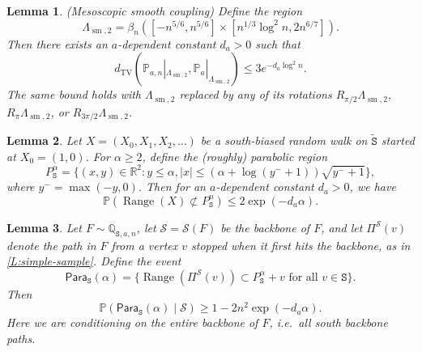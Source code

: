 \documentclass[10pt,a4paper]{amsart}
\newtheorem{lem}{Lemma}
\renewcommand{\P}{\mathbb{P}}
\newcommand{\Q}{\mathbb{Q}}
\newcommand{\R}{\mathbb{R}}
\newcommand{\cS}{\mathcal{S}}
\renewcommand{\tt}[1]{{\mathtt{#1}}}
\begin{document}
	\begin{lem} (Mesoscopic smooth coupling)
		\label{L:global-coupling-2}
		Define the region
		$$
		\Lambda_{\operatorname{sm}, 2} = \beta_n([-n^{5/6} , n^{5/6}] \times [n^{1/3} \log^2 n, 2 n^{6/7}]). 
		$$
		Then there exists an $a$-dependent constant $d_a > 0$ such that
		$$
		d_{\operatorname{TV}}(\P_{a, n}|_{\Lambda_{\operatorname{sm}, 2}}, \P_a|_{\Lambda_{\operatorname{sm}, 2}}) \le 3 e^{- d_a \log^2 n}.
		$$
		The same bound holds with $\Lambda_{\operatorname{sm}, 2}$ replaced by any of its rotations $R_{\pi/2} \Lambda_{\operatorname{sm}, 2}$, $R_{\pi} \Lambda_{\operatorname{sm}, 2}$, or $R_{3\pi/2} \Lambda_{\operatorname{sm}, 2}$.
	\end{lem}

	\begin{lem}
		\label{L:lerw-estimate-basic}
		Let $X = (X_0, X_1, X_2, \dots)$ be a south-biased random walk on $\tt{\tilde S}$ started at $X_0 = (1, 0)$. For $\alpha \ge 2$, define the (roughly) parabolic region
		$$
		P^\alpha_\tt{S} = \{(x, y) \in \R^2 : y \le \alpha, |x| \le (\alpha + \log(y^- + 1))\sqrt{y^- + 1}\},
		$$
		where $y^- = \max(-y, 0)$.
		Then for an $a$-dependent constant $d_a > 0$, we have
		$$
		\P(\operatorname{Range}(X) \not\subset P^n_\tt{S}) \le 2 \exp (-d_a \alpha).
		$$
	\end{lem} 

	\begin{lem}
		\label{L:regular-paths}
		Let $F \sim \Q_{\tt{S}, a, n}$, let $\cS = \cS(F)$ be the backbone of $F$, and let $\Pi^\cS(v)$ denote the path in $F$ from a vertex $v$ stopped when it first hits the backbone, as in \cref{L:simple-sample}. Define the event
		$$
		\mathsf{Para}_\tt{S}(\alpha) = \{\operatorname{Range}(\Pi^\cS(v)) \subset P^\alpha_\tt{S} + v \text{ for all } v \in \tt{S}\}.
		$$
		Then
		$$
		\P(\mathsf{Para}_\tt{S}(\alpha) \mid \cS) \ge 1 - 2 n^2 \exp(-d_a \alpha).
		$$
        Here we are conditioning on the entire backbone of $F$, i.e.\ all south backbone paths.
	\end{lem}
\end{document}
